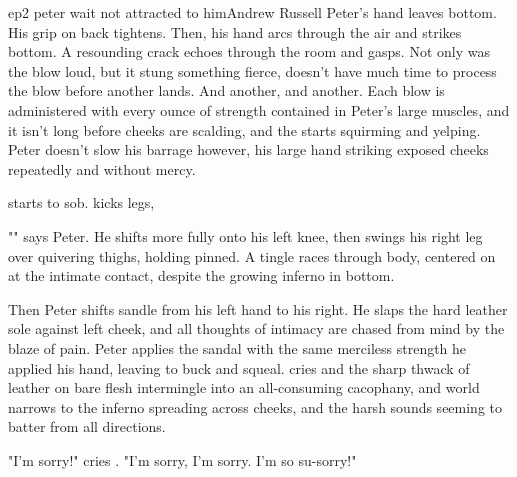 \documentclass{book}
\begin{document}
\begin{childnode}{ep2 peter wait not attracted to him}{Andrew Russell}
    Peter's hand leaves \names{} bottom. His grip on \names{} back tightens. Then, his hand arcs through the air and strikes \names{} bottom. A resounding crack echoes through the room and \name{} gasps. Not only was the blow loud, but it stung something fierce,
     \name{} doesn't have much time to process the blow before another lands. And another, and another. Each
    blow is administered with every ounce of strength contained in Peter's large muscles, and it isn't long before \names{} cheeks are scalding, and the \boygirl{} starts squirming and yelping. Peter doesn't slow his barrage however, his large hand striking
    \names{} exposed cheeks repeatedly and without mercy.

    \name{} starts to sob. \HeShe{} kicks \hisher{} legs,  

    "" says Peter. He shifts \name{} more fully onto 
    his left knee, then swings his right leg over \names{} quivering thighs, holding \himher{} pinned. A tingle races through \names{} body, centered on \hisher{}  at the intimate contact, despite the growing inferno in \hisher{} bottom.

    Then Peter shifts \names{} sandle from his left hand to his right. He slaps the hard leather sole against \names{} left cheek, and all thoughts of intimacy are chased from \names{} mind by the blaze of pain.  Peter applies the sandal with the same merciless
    strength he applied his hand, leaving \name{} to buck and squeal. \HisHer{} cries and the sharp thwack of leather on bare flesh intermingle into an all-consuming cacophany, and \names{} world narrows to the inferno spreading across \hisher{} cheeks, and the 
    harsh sounds seeming to batter \himher{} from all directions.
    
    "I'm sorry!" cries \name{}. "I'm sorry, I'm sorry. I'm so su-sorry!"


\end{childnode}
\end{document}
